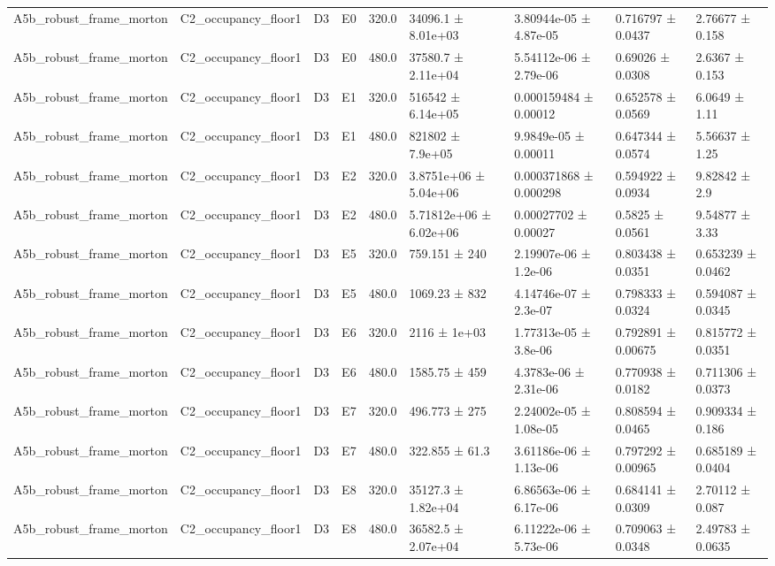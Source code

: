 \begin{table}
\begin{tabular}{lllllllll}
A5b\_robust\_frame\_morton & C2\_occupancy\_floor1 & D3 & E0 & 320.0 & 34096.1 ± 8.01e+03 & 3.80944e-05 ± 4.87e-05 & 0.716797 ± 0.0437 & 2.76677 ± 0.158 \\
A5b\_robust\_frame\_morton & C2\_occupancy\_floor1 & D3 & E0 & 480.0 & 37580.7 ± 2.11e+04 & 5.54112e-06 ± 2.79e-06 & 0.69026 ± 0.0308 & 2.6367 ± 0.153 \\
A5b\_robust\_frame\_morton & C2\_occupancy\_floor1 & D3 & E1 & 320.0 & 516542 ± 6.14e+05 & 0.000159484 ± 0.00012 & 0.652578 ± 0.0569 & 6.0649 ± 1.11 \\
A5b\_robust\_frame\_morton & C2\_occupancy\_floor1 & D3 & E1 & 480.0 & 821802 ± 7.9e+05 & 9.9849e-05 ± 0.00011 & 0.647344 ± 0.0574 & 5.56637 ± 1.25 \\
A5b\_robust\_frame\_morton & C2\_occupancy\_floor1 & D3 & E2 & 320.0 & 3.8751e+06 ± 5.04e+06 & 0.000371868 ± 0.000298 & 0.594922 ± 0.0934 & 9.82842 ± 2.9 \\
A5b\_robust\_frame\_morton & C2\_occupancy\_floor1 & D3 & E2 & 480.0 & 5.71812e+06 ± 6.02e+06 & 0.00027702 ± 0.00027 & 0.5825 ± 0.0561 & 9.54877 ± 3.33 \\
A5b\_robust\_frame\_morton & C2\_occupancy\_floor1 & D3 & E5 & 320.0 & 759.151 ± 240 & 2.19907e-06 ± 1.2e-06 & 0.803438 ± 0.0351 & 0.653239 ± 0.0462 \\
A5b\_robust\_frame\_morton & C2\_occupancy\_floor1 & D3 & E5 & 480.0 & 1069.23 ± 832 & 4.14746e-07 ± 2.3e-07 & 0.798333 ± 0.0324 & 0.594087 ± 0.0345 \\
A5b\_robust\_frame\_morton & C2\_occupancy\_floor1 & D3 & E6 & 320.0 & 2116 ± 1e+03 & 1.77313e-05 ± 3.8e-06 & 0.792891 ± 0.00675 & 0.815772 ± 0.0351 \\
A5b\_robust\_frame\_morton & C2\_occupancy\_floor1 & D3 & E6 & 480.0 & 1585.75 ± 459 & 4.3783e-06 ± 2.31e-06 & 0.770938 ± 0.0182 & 0.711306 ± 0.0373 \\
A5b\_robust\_frame\_morton & C2\_occupancy\_floor1 & D3 & E7 & 320.0 & 496.773 ± 275 & 2.24002e-05 ± 1.08e-05 & 0.808594 ± 0.0465 & 0.909334 ± 0.186 \\
A5b\_robust\_frame\_morton & C2\_occupancy\_floor1 & D3 & E7 & 480.0 & 322.855 ± 61.3 & 3.61186e-06 ± 1.13e-06 & 0.797292 ± 0.00965 & 0.685189 ± 0.0404 \\
A5b\_robust\_frame\_morton & C2\_occupancy\_floor1 & D3 & E8 & 320.0 & 35127.3 ± 1.82e+04 & 6.86563e-06 ± 6.17e-06 & 0.684141 ± 0.0309 & 2.70112 ± 0.087 \\
A5b\_robust\_frame\_morton & C2\_occupancy\_floor1 & D3 & E8 & 480.0 & 36582.5 ± 2.07e+04 & 6.11222e-06 ± 5.73e-06 & 0.709063 ± 0.0348 & 2.49783 ± 0.0635 \\

\end{tabular}
\end{table}
